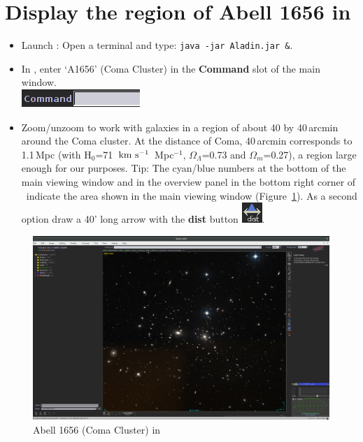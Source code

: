 \documentclass [a4paper, 12pt]{article}
\begin{document}
\section{Display the region of Abell 1656 in \aladin}
\label{sec:display}
\begin{itemize}
\item Launch \aladin: Open a terminal and type: \texttt{java -jar Aladin.jar
\&}.
\item In \aladin, enter `A1656' (Coma Cluster) in the \textbf{Command} slot of
the main window. \\
\includegraphics[width=0.2 \textwidth]{../images/aladin_command_empty.png}
\item Zoom/unzoom to work with galaxies in a region of about 40 by 40\,arcmin
around the Coma cluster. At the distance of Coma, 40\,arcmin corresponds to
1.1\,Mpc (with H$_0$=71~$\rm km\ s^{-1}$~Mpc$^{-1}$, $\Omega_\Lambda$=0.73 and
$\Omega_m$=0.27), a region large enough for our purposes. Tip:
The cyan/blue numbers at the bottom of the main viewing window and in the
overview panel in the bottom right corner of \aladin\ indicate the area shown
in the main viewing window (Figure~\ref{fig:aladinA1656}). As a second option
draw a 40' long arrow with the
\textbf{dist} button \includegraphics[width=0.03
\textwidth]{../images/aladin_button_distance.png}.
\end{itemize}


\begin{figure}[H]
\center
\includegraphics[width=0.85 \textwidth]{../images/aladin_a1656_new.png}
\caption{Abell 1656 (Coma Cluster) in \aladin}
\label{fig:aladinA1656}
\end{figure}
\end{document}
